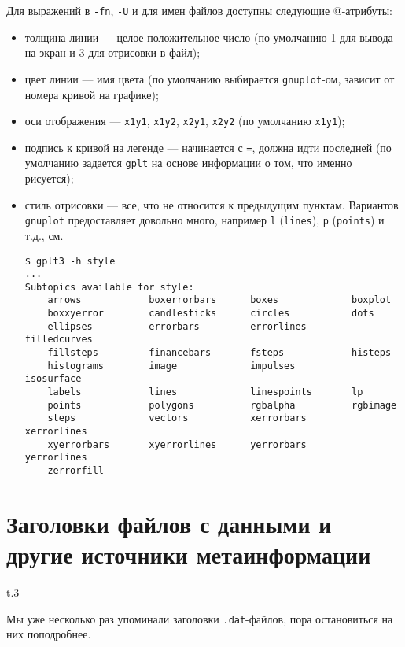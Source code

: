 \documentclass[12pt]{article}
\def\gplt{{\tt gplt}}
\def\gnuplot{{\tt gnuplot}}
\begin{document}
Для выражений в \verb'-fn', \verb'-U' и для имен файлов доступны следующие @-атрибуты:
\begin{itemize}
\item толщина линии --- целое положительное число (по умолчанию 1 для вывода на экран и 3 для отрисовки в файл);
\item цвет линии --- имя цвета (по умолчанию выбирается \gnuplot-ом, зависит от номера кривой на графике);
\item оси отображения --- \verb'x1y1', \verb'x1y2', \verb'x2y1', \verb'x2y2' (по умолчанию \verb'x1y1');
\item подпись к кривой на легенде --- начинается с \verb'=', должна идти последней (по умолчанию задается \gplt{} на основе информации о том, что именно рисуется);
\item стиль отрисовки --- все, что не относится к предыдущим пунктам. Вариантов \gnuplot{} предоставляет довольно много, например \verb'l' (\verb'lines'),
  \verb'p' (\verb'points') и т.д., см.
\begin{verbatim}
$ gplt3 -h style
...
Subtopics available for style:
    arrows            boxerrorbars      boxes             boxplot
    boxxyerror        candlesticks      circles           dots
    ellipses          errorbars         errorlines        filledcurves
    fillsteps         financebars       fsteps            histeps
    histograms        image             impulses          isosurface
    labels            lines             linespoints       lp
    points            polygons          rgbalpha          rgbimage
    steps             vectors           xerrorbars        xerrorlines
    xyerrorbars       xyerrorlines      yerrorbars        yerrorlines
    zerrorfill
\end{verbatim}
\end{itemize}
\newpage

\section{Заголовки файлов с данными и другие источники метаинформации}\label{metainfo:sec}
\begin{wrapfigure}[5]{t}{.3\textwidth}
  \vphantom{.}
  \vspace{-1.2cm}

\end{wrapfigure}
Мы уже несколько раз упоминали заголовки \verb'.dat'-файлов, пора остановиться на них поподробнее.
\end{document}
